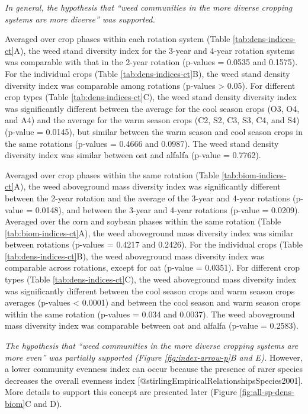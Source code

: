 \documentclass[
]{article}
\begin{document}
\emph{In general, the hypothesis that ``weed communities in the more diverse cropping systems are more diverse'' was supported.}

Averaged over crop phases within each rotation system (Table \ref{tab:dens-indices-ct}A), the weed stand diversity index for the 3-year and 4-year rotation systems was comparable with that in the 2-year rotation (p-values = 0.0535 and 0.1575). For the individual crops (Table \ref{tab:dens-indices-ct}B), the weed stand density diversity index was comparable among rotations (p-values \textgreater{} 0.05). For different crop types (Table \ref{tab:dens-indices-ct}C), the weed stand density diversity index was significantly different between the average for the cool season crops (O3, O4, and A4) and the average for the warm season crops (C2, S2, C3, S3, C4, and S4) (p-value = 0.0145), but similar between the warm season and cool season crops in the same rotations (p-values = 0.4666 and 0.0987). The weed stand density diversity index was similar between oat and alfalfa (p-value = 0.7762).

Averaged over crop phases within the same rotation (Table \ref{tab:biom-indices-ct}A), the weed aboveground mass diversity index was significantly different between the 2-year rotation and the average of the 3-year and 4-year rotations (p-value = 0.0148), and between the 3-year and 4-year rotations (p-value = 0.0209). Averaged over the corn and soybean phases within the same rotation (Table \ref{tab:biom-indices-ct}A), the weed aboveground mass diversity index was similar between rotations (p-values = 0.4217 and 0.2426). For the individual crops (Table \ref{tab:dens-indices-ct}B), the weed aboveground mass diversity index was comparable across rotations, except for oat (p-value = 0.0351). For different crop types (Table \ref{tab:dens-indices-ct}C), the weed aboveground mass diversity index was significantly different between the cool season crops and warm season crops averages (p-values \textless{} 0.0001) and between the cool season and warm season crops within the same rotation (p-values = 0.034 and 0.0037). The weed aboveground mass diversity index was comparable between oat and alfalfa (p-value = 0.2583).

\emph{The hypothesis that ``weed communities in the more diverse cropping systems are more even'' was partially supported (Figure \ref{fig:index-arrow-p}B and E).} However, a lower community evenness index can occur because the presence of rarer species decreases the overall evenness index {[}@stirlingEmpiricalRelationshipsSpecies2001{]}. More details to support this concept are presented later (Figure \ref{fig:all-sp-dens-biom}C and D).
\end{document}
